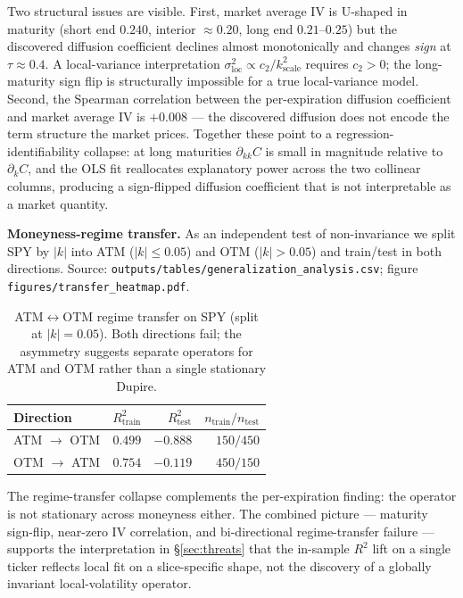 \documentclass[10pt]{article}
\begin{document}
Two structural issues are visible. First, market average IV is U-shaped in maturity (short end $0.240$, interior $\approx 0.20$, long end $0.21$--$0.25$) but the discovered diffusion coefficient declines almost monotonically and changes \emph{sign} at $\tau \approx 0.4$. A local-variance interpretation $\sigma_{\text{loc}}^2 \propto c_2 / k^2_{\text{scale}}$ requires $c_2 > 0$; the long-maturity sign flip is structurally impossible for a true local-variance model. Second, the Spearman correlation between the per-expiration diffusion coefficient and market average IV is $+0.008$ --- the discovered diffusion does not encode the term structure the market prices. Together these point to a regression-identifiability collapse: at long maturities $\partial_{kk} C$ is small in magnitude relative to $\partial_k C$, and the OLS fit reallocates explanatory power across the two collinear columns, producing a sign-flipped diffusion coefficient that is not interpretable as a market quantity.

\textbf{Moneyness-regime transfer.} As an independent test of non-invariance we split SPY by $|k|$ into ATM ($|k| \le 0.05$) and OTM ($|k| > 0.05$) and train/test in both directions. Source: \texttt{outputs/tables/generalization\_analysis.csv}; figure \texttt{figures/transfer\_heatmap.pdf}.

\begin{table}[h]
\centering\footnotesize
\caption{ATM$\leftrightarrow$OTM regime transfer on SPY (split at $|k|{=}0.05$). Both directions fail; the asymmetry suggests separate operators for ATM and OTM rather than a single stationary Dupire.}
\label{tab:regime-transfer}
\begin{tabular}{lrrr}
\toprule
Direction & $R^2_{\text{train}}$ & $R^2_{\text{test}}$ & $n_{\text{train}} / n_{\text{test}}$ \\
\midrule
ATM $\to$ OTM & $0.499$ & $\mathbf{-0.888}$ & $150 / 450$ \\
OTM $\to$ ATM & $0.754$ & $\mathbf{-0.119}$ & $450 / 150$ \\
\bottomrule
\end{tabular}
\end{table}

The regime-transfer collapse complements the per-expiration finding: the operator is not stationary across moneyness either. The combined picture --- maturity sign-flip, near-zero IV correlation, and bi-directional regime-transfer failure --- supports the interpretation in \S\ref{sec:threats} that the in-sample $R^2$ lift on a single ticker reflects local fit on a slice-specific shape, not the discovery of a globally invariant local-volatility operator.
\end{document}

